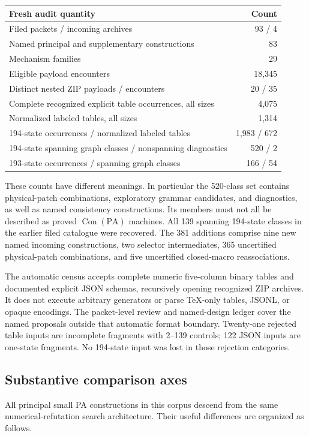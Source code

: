 \documentclass[11pt,a4paper]{article}
\theoremstyle{definition}
\newcommand{\PA}{\mathrm{PA}}
\newcommand{\Con}{\operatorname{Con}}
\begin{document}
\begin{center}
\begin{tabular}{lr}
\toprule
Fresh audit quantity & Count\\
\midrule
Filed packets / incoming archives & 93 / 4\\
Named principal and supplementary constructions & 83\\
Mechanism families & 29\\
Eligible payload encounters & 18,345\\
Distinct nested ZIP payloads / encounters & 20 / 35\\
Complete recognized explicit table occurrences, all sizes & 4,075\\
Normalized labeled tables, all sizes & 1,314\\
194-state occurrences / normalized labeled tables & 1,983 / 672\\
194-state spanning graph classes / nonspanning diagnostics & 520 / 2\\
193-state occurrences / spanning graph classes & 166 / 54\\
\bottomrule
\end{tabular}
\end{center}

These counts have different meanings. In particular the 520-class set
contains physical-patch combinations, exploratory grammar candidates,
and diagnostics, as well as named consistency constructions. Its members
must not all be described as proved $\Con(\PA)$ machines. All 139 spanning
194-state classes in the earlier filed catalogue were recovered. The
381 additions comprise nine new named incoming constructions, two
selector intermediates, 365 uncertified physical-patch combinations,
and five uncertified closed-macro reassociations.

The automatic census accepts complete numeric five-column binary tables
and documented explicit JSON schemas, recursively opening recognized
ZIP archives. It does not execute arbitrary generators or parse
TeX-only tables, JSONL, or opaque encodings. The packet-level review
and named-design ledger cover the named proposals outside that automatic
format boundary. Twenty-one rejected table inputs are incomplete
fragments with 2--139 controls; 122 JSON inputs are one-state fragments.
No 194-state input was lost in those rejection categories.

\subsection{Substantive comparison axes}
All principal small PA constructions in this corpus descend from the
same numerical-refutation search architecture. Their useful differences
are organized as follows.
\end{document}
